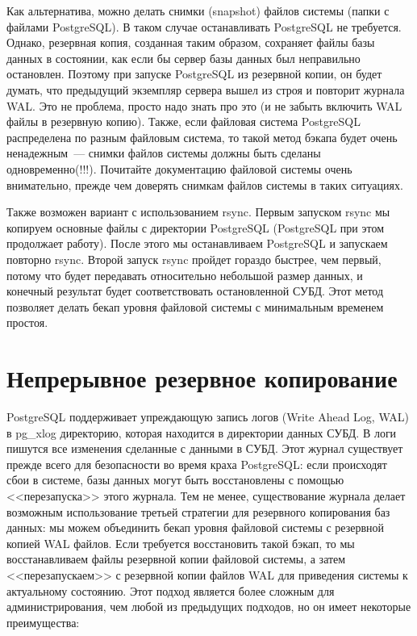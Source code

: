 Как альтернатива, можно делать снимки (snapshot) файлов системы (папки с файлами PostgreSQL). В таком случае останавливать PostgreSQL не требуется. Однако, резервная копия, созданная таким образом, сохраняет файлы базы данных в состоянии, как если бы сервер базы данных был неправильно остановлен. Поэтому при запуске PostgreSQL из резервной копии, он будет думать, что предыдущий экземпляр сервера вышел из строя и повторит журнала WAL. Это не проблема, просто надо знать про это (и не забыть включить WAL файлы в резервную копию). Также, если файловая система PostgreSQL распределена по разным файловым система, то такой метод бэкапа будет очень ненадежным~--- снимки файлов системы должны быть сделаны одновременно(!!!). Почитайте документацию файловой системы очень внимательно, прежде чем доверять снимкам файлов системы в таких ситуациях.

Также возможен вариант с использованием rsync. Первым запуском rsync мы копируем основные файлы с директории PostgreSQL (PostgreSQL при этом продолжает работу). После этого мы останавливаем PostgreSQL и запускаем повторно rsync. Второй запуск rsync пройдет гораздо быстрее, чем первый, потому что будет передавать относительно небольшой размер данных, и конечный результат будет соответствовать остановленной СУБД. Этот метод позволяет делать бекап уровня файловой системы с минимальным временем простоя.

\section{Непрерывное резервное копирование}

PostgreSQL поддерживает упреждающую запись логов (Write Ahead Log, WAL) в pg\_xlog директорию, которая находится в директории данных СУБД. В логи пишутся все изменения сделанные с данными в СУБД. Этот журнал существует прежде всего для безопасности во время краха PostgreSQL: если происходят сбои в системе, базы данных могут быть восстановлены с помощью <<перезапуска>> этого журнала. Тем не менее, существование журнала делает возможным использование третьей стратегии для резервного копирования баз данных: мы можем объединить бекап уровня файловой системы с резервной копией WAL файлов. Если требуется восстановить такой бэкап, то мы восстанавливаем файлы резервной копии файловой системы, а затем <<перезапускаем>> с резервной копии файлов WAL для приведения системы к актуальному состоянию. Этот подход является более сложным для администрирования, чем любой из предыдущих подходов, но он имеет некоторые преимущества:

